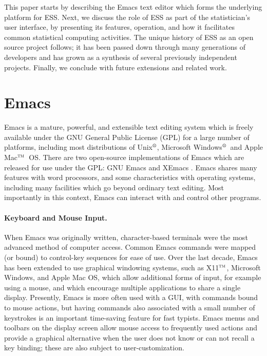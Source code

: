 \documentclass{article}
\newcommand*{\regstrd}{$^{\mbox{\scriptsize{\textregistered}}}$}
\newcommand*{\tm}{$^{\mbox{\scriptsize\sc tm}}$}
\begin{document}
This paper starts by describing the Emacs text editor which forms the
underlying platform for ESS.  Next, we discuss the role of ESS as part
of the statistician's user interface, by presenting its features,
operation, and how it facilitates common statistical computing
activities.  The unique history of ESS as an open source project
follows; it has been passed down through many generations of
developers and has grown as a synthesis of several previously
independent projects.  Finally, we conclude with future extensions and
related work.

\section{Emacs}
\label{sec:emacs}

Emacs is a mature, powerful, and extensible text editing system which
is freely available under the GNU General Public License (GPL) for a
large number of platforms, including most distributions of
Unix\regstrd, Microsoft Windows\regstrd\ and Apple Mac\tm\ OS.  There
are two open-source implementations of Emacs which are released for
use under the GPL: GNU Emacs \citep{GNU-Emacs} and XEmacs
\citep{XEmacs}.  Emacs shares many features with word processors, and
some characteristics with operating systems, including many facilities
which go beyond ordinary text editing.  Most importantly in this
context, Emacs can interact with and control other programs.

\paragraph{Keyboard and Mouse Input.}
When Emacs was originally written, character-based terminals were the
most advanced method of computer access.  Common Emacs commands were
mapped (or bound) to control-key sequences for ease of use.  Over the
last decade, Emacs has been extended to use graphical windowing
systems, such as X11\tm, Microsoft Windows, and Apple Mac OS, which
allow additional forms of input, for example using a mouse, and which
encourage multiple applications to share a single display.  Presently,
Emacs is more often used with a GUI, with commands bound to mouse
actions, but having commands also associated with a small number of
keystrokes is an important time-saving feature for fast typists.
Emacs menus and toolbars on the display screen allow mouse access to
frequently used actions and provide a graphical alternative when the
user does not know or can not recall a key binding; these are also
subject to user-customization.
\end{document}
